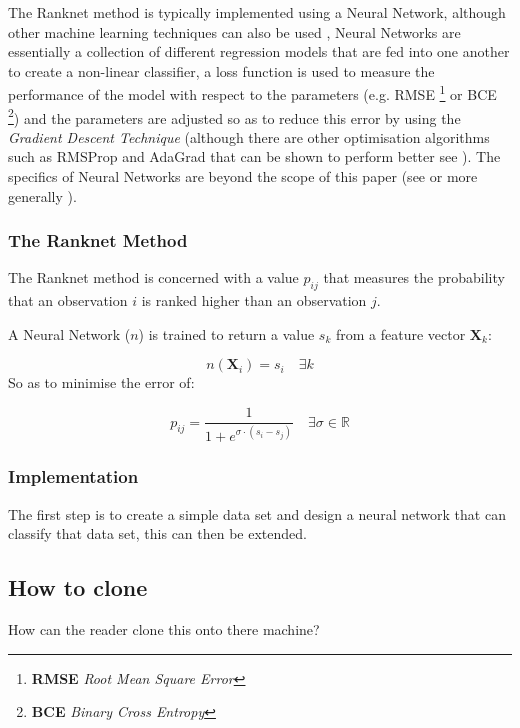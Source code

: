 \documentclass[a4paper,11pt,twoside]{article}
\begin{document}
The Ranknet method is typically implemented using a Neural Network,
although other machine learning techniques can also be used
\cite[]{christopherburgesRankNetRankingRetrospective2015},
Neural Networks are essentially a collection of different
regression models that are fed into one another to create a
non-linear classifier, a loss function is used to measure the
performance of the model with respect to the parameters
(e.g. RMSE \footnote{\textbf{RMSE} \emph{Root Mean Square Error}} or BCE \footnote{\textbf{BCE} \emph{Binary Cross Entropy}}) and the parameters are adjusted so
as to reduce this error by using the \emph{Gradient Descent Technique}
(although there are other optimisation algorithms such as RMSProp
and AdaGrad \cite{mukkamalaVariantsRMSPropAdagrad2017} that can be
shown to perform better see
\cite{bushaevUnderstandingRMSpropFaster2018}). The specifics of
Neural Networks are beyond the scope of this paper (see
\cite{hmkcodeBackpropagationStepStep} or more generally \cite{pictonNeuralNetworks1994}).

\subsubsection{The Ranknet Method}
\label{sec:org042938a}

The Ranknet method is concerned with a value \(p_{ij}\) that
measures the probability that an observation \(i\) is ranked higher
than an observation \(j\).

A Neural Network (\(n\)) is trained to return a value
\(s_k\) from a feature vector \(\mathbf{X}_k\):

 \[n(\mathbf{X}_i) = s_i \quad \exists k\]
So as to minimise the error of:


\[
  p_{ij} = \frac{1}{1+e^{\sigma \cdot (s_i-s_j)}} \quad \exists \sigma
  \in \mathbb{R}
  \]

\subsubsection{Implementation}
\label{sec:org01aac30}
The first step is to create a simple data set and design a neural
network that can classify that data set, this can then be extended.

\subsection{How to clone}
\label{sec:orgcd1d189}
How can the reader clone this onto there machine?
\end{document}

